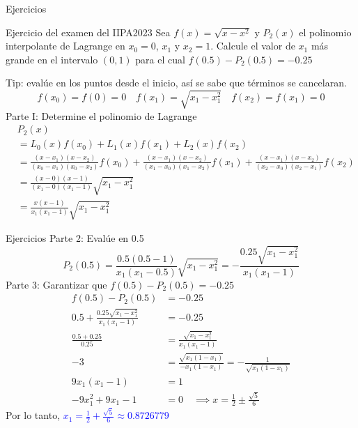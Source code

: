 \begin{frame}{Ejercicios}
\begin{block}{Ejercicio del examen del IIPA2023}
Sea $f(x)=\sqrt{x-x^2}$ y $P_2(x)$ el polinomio interpolante de Lagrange en $x_0=0$, $x_1$ y $x_2=1$. Calcule el valor de $x_1$ más grande en el intervalo $(0,1)$ para el cual $f(0.5)-P_2(0.5)=-0.25$ 
\end{block}
\small
Tip: evalúe en los puntos desde el inicio, así se sabe que términos se cancelaran.
$$f(x_0)=f(0)=0 \quad f(x_1)=\sqrt{x_1-x_1^2}\quad f(x_2)=f(x_1)=0$$
Parte I: Determine el polinomio de Lagrange
\begin{align*}
&P_2(x)\\
&=L_0(x)f(x_0)+L_1(x)f(x_1)+L_2(x)f(x_2)\\
&=\frac{(x-x_1)(x-x_2)}{(x_0-x_1)(x_0-x_2)}f(x_0)+\frac{(x-x_1)(x-x_2)}{(x_1-x_0)(x_1-x_2)}f(x_1)+\frac{(x-x_1)(x-x_2)}{(x_2-x_0)(x_2-x_1)}f(x_2)\\
&=\frac{(x-0)(x-1)}{(x_1-0)(x_1-1)}\sqrt{x_1-x_1^2}\\
&=\frac{x(x-1)}{x_1(x_1-1)}\sqrt{x_1-x_1^2}
\end{align*}
\end{frame}
\begin{frame}{Ejercicios}
\small
Parte 2: Evalúe en 0.5
$$P_2(0.5)=\frac{0.5(0.5-1)}{x_1(x_1-0.5)}\sqrt{x_1-x_1^2}=-\frac{0.25\sqrt{x_1-x_1^2}}{x_1(x_1-1)}$$
Parte 3: Garantizar que $f(0.5)-P_2(0.5)=-0.25$ 
\begin{align*}
f(0.5)-P_2(0.5)&=-0.25\\
0.5+\frac{0.25\sqrt{x_1-x_1^2}}{x_1(x_1-1)}&=-0.25\\
\frac{0.5+0.25}{0.25}&=\frac{\sqrt{x_1-x_1^2}}{x_1(x_1-1)}\\
-3&=\frac{\sqrt{x_1(1-x_1)}}{-x_1(1-x_1)}=-\frac{1}{\sqrt{x_1(1-x_1)}}\\
9x_1(x_1-1)&=1\\
-9x_1^2+9x_1-1&=0 \quad \implies x=\frac{1}{2}\pm\frac{\sqrt{5}}{6}
\end{align*}
Por lo tanto, \textcolor{blue}{$x_1=\frac{1}{2}+\frac{\sqrt{5}}{6}\approx 0.8726779$} 
\end{frame}
